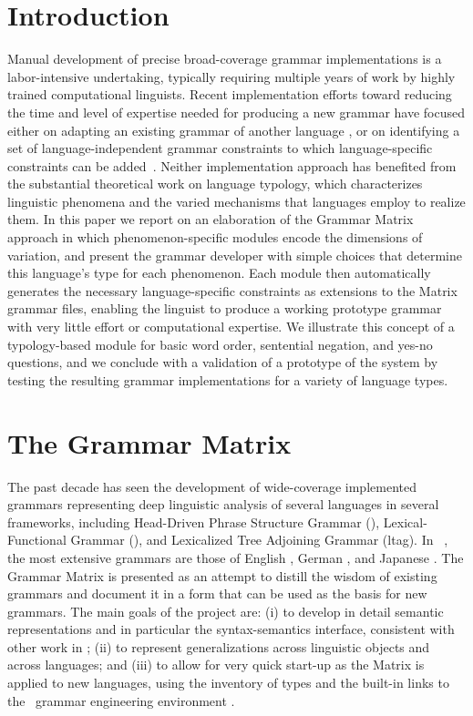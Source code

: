 \section{Introduction}
Manual development of precise broad-coverage grammar implementations
is a labor-intensive undertaking, typically requiring multiple years
of work by highly trained computational linguists.  Recent
implementation efforts toward reducing the time and level of expertise
needed for producing a new grammar have focused either on adapting an
existing grammar of another language
\cite{Butt-et-al-02,Kim:Dal:Kap:Kin:Mas:Ohk:03,Bat:Kru:Kru:ta}, or on
identifying a set of language-independent grammar constraints to which
language-specific constraints can be added~\cite{Ben:Fli:Oe:02}.
Neither implementation approach has benefited from the substantial
theoretical work on language typology, which characterizes linguistic
phenomena and the varied mechanisms that languages employ to realize
them.  In this paper we report on an elaboration of the Grammar Matrix
approach in which phenomenon-specific modules encode the dimensions of
variation, and present the grammar developer with simple choices that
determine this language's type for each phenomenon. Each module then
automatically generates the necessary language-specific constraints as
extensions to the Matrix grammar files, enabling the linguist to
produce a working prototype grammar with very little effort or
computational expertise.  We illustrate this concept of a
typology-based module for basic word order, sentential negation, and
yes-no questions, and we conclude with a validation of a prototype of
the system by testing the resulting grammar implementations for a variety
of language types.

\section{The Grammar Matrix}

The past decade has seen the development of wide-coverage implemented
grammars representing deep linguistic analysis of several languages in
several frameworks, including Head-Driven Phrase Structure Grammar
(\hpsg), Lexical-Functional Grammar (\lfg), and Lexicalized Tree
Adjoining Grammar ({\sc ltag}). In \hpsg\ \cite{Pol:Sag:94}, the most
extensive grammars are those of English \cite{Flickinger:00}, German
\cite{Hinrichs:etal:97,Mue:Kap:00}, and Japanese \cite{Siegel:00,Siegel:Bender:02}.
The Grammar Matrix \cite{Ben:Fli:Oe:02} is presented as 
an attempt to distill the
wisdom of existing grammars and document it in a form that can
be used as the basis for new grammars. The main goals of the project
are: (i) to develop in detail semantic representations and in particular 
the syntax-semantics interface, consistent with other work in \hpsg; 
(ii) to represent generalizations across linguistic objects
and across languages; and (iii) to allow for very quick start-up as 
the Matrix is applied to new languages, using the inventory of types and
the built-in links to the \lkb\ grammar engineering environment
\cite{Copestake:02}.


